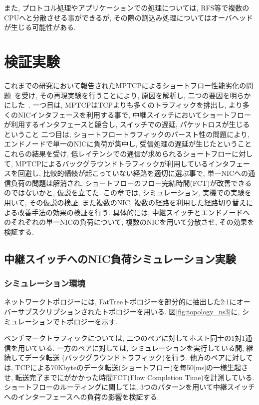 \documentclass[11pt, a4paper, twocolumn]{jsarticle}
\begin{document}
また, プロトコル処理やアプリケーションでの処理については, RFS等で複数のCPUへと分散させる事ができるが,
その際の割込み処理についてはオーバヘッドが生じる可能性がある.


\section{検証実験}
\label{sec:verification}
これまでの研究において報告されたMPTCPによるショートフロー性能劣化の問題~\cite{improving}を受け, その再現実験を行うことにより,
原因を解析し, 二つの要因を明らかにした~\cite{mptcp_ana}.
一つ目は, MPTCPはTCPよりも多くのトラフィックを排出し, より多くのNICインタフェースを利用する事で,
中継スイッチにおいてショートフローが利用するインタフェースと競合し, スイッチでの遅延, パケットロスが生じるということ
二つ目は, ショートフロートラフィックのバースト性の問題により, エンドノードで単一のNICに負荷が集中し, 受信処理の遅延が生じたということ
これらの結果を受け,
低レイテンシでの通信が求められるショートフローに対して, MPTCPによるバックグラウンドトラフィックが利用しているインタフェースを回避し,
比較的輻輳が起こっていない経路を適切に選ぶ事で,
単一NICへの通信負荷の問題は解消され, ショートフローのフロー完結時間(FCT)が改善できるのではないかと, 仮説を立てた.
この章では, シミュレーション, 実機での実験を用いて, その仮説の検証,
また複数のNIC, 複数の経路を利用した経路切り替えによる改善手法の効果の検証を行う.
具体的には, 中継スイッチとエンドノードへのそれぞれの単一NICの負荷について, 複数のNICを用いて分散させ, その効果を検証する.

\subsection{中継スイッチへのNIC負荷シミュレーション実験}
\subsubsection{シミュレーション環境}

ネットワークトポロジーには,
FatTreeトポロジーを部分的に抽出した2:1にオーバーサブスクリプションされたトポロジーを用いる.
図\ref{fig:topology_ns3}に, シミュレーションでトポロジーを示す.

ベンチマークトラフィックについては, 二つのペアに対してホスト同士の1対1通信を用いている.
一方のペアに対しては, シミュレーションを実行している間, 継続してデータ転送 (バックグラウンドトラフィック)を行う.
他方のペアに対しては, TCPによる70Kbyteのデータ転送(ショートフロー)を毎50[ms]の一様生起させ,
転送完了までにがかかった時間FCT(Flow Completion Time)を計測している.
ショートフローのルーティングに関しては, 3つのパターンを用いて中継スイッチへのインターフェースへの負荷の影響を検証する.
\end{document}

